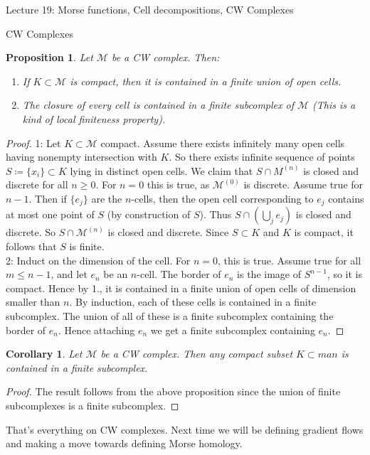 \documentclass[10pt]{article}
\theoremstyle{plain}
\newtheorem{corollary}[thm]{Corollary}
\newtheorem{prop}[thm]{Proposition}
\theoremstyle{definition}
\newcommand{\man}{\mathcal{M}}
\begin{document}
\begin{section}{Lecture 19: Morse functions, Cell decompositions, CW Complexes}
\begin{subsection}{CW Complexes}
\begin{prop}
   Let $\man$ be a CW complex. Then:
   \begin{enumerate}
       \item If $K\subset \man$ is compact, then it is contained in a finite union of open cells.
       \item The closure of every cell is contained in a finite subcomplex of $\man$ (This is a kind of local finiteness property).
   \end{enumerate}
\end{prop}

\begin{proof}
   1: Let $K\subset \man$ compact. Assume there exists infinitely many open cells having nonempty intersection with $K$. So there exists infinite sequence of points $S \coloneqq \{x_i\}\subset K$ lying in distinct open cells. We claim that $S\cap M^{(n)}$ is closed and discrete for all $n\geq 0$. For $n=0$ this is true, as $\man^{(0)}$ is discrete. Assume true for $n-1$. Then if $\{e_j\}$ are the $n$-cells, then the open cell corresponding to $e_j$ contains at most one point of $S$ (by construction of $S$). Thus $S\cap (\bigcup_j e_j)$ is closed and discrete. So $S\cap \man^{(n)}$ is closed and discrete. Since $S \subset K$ and $K$ is compact, it follows that $S$ is finite. \\
   2: Induct on the dimension of the cell. For $n=0$, this is true. Assume true for all $m\leq n-1$, and let $e_n$ be an $n$-cell. The border of $e_n$ is the image of $S^{n-1}$, so it is compact. Hence by 1., it is contained in a finite union of open cells of dimension smaller than $n$. By induction, each of these cells is contained in a finite subcomplex. The union of all of these is a finite subcomplex containing the border of $e_n$. Hence attaching $e_n$ we get a finite subcomplex containing $e_n$.
\end{proof}

\begin{corollary}
    Let $\man$ be a CW complex. Then any compact subset $K\subset man$ is contained in a finite subcomplex.
\end{corollary}

\begin{proof}
    The result follows from the above proposition since the union of finite subcomplexes is a finite subcomplex.
\end{proof}
That's everything on CW complexes. Next time we will be defining gradient flows and making a move towards defining Morse homology.
\end{subsection}
\end{section}
\end{document}
